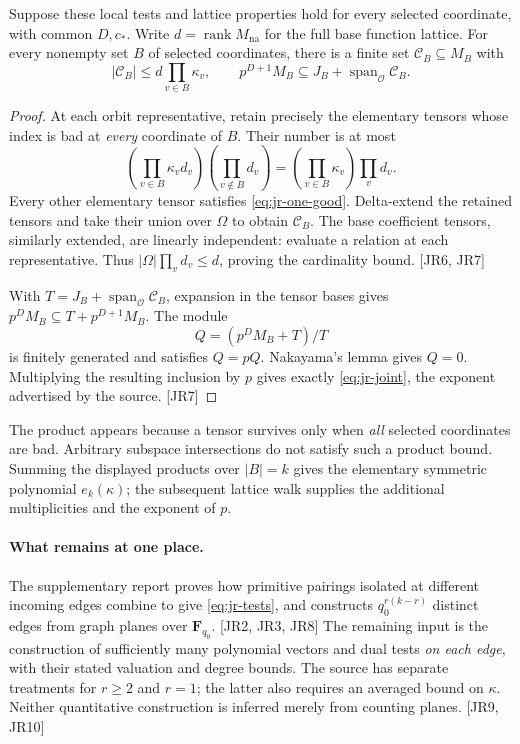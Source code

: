 \begin{proposition}\label{prop:jr-joint}
Suppose these local tests and lattice properties hold for every selected coordinate, with common $D,c_*$. Write $d=\operatorname{rank}M_{\mathrm{na}}$ for the full base function lattice. For every nonempty set $B$ of selected coordinates, there is a finite set $\mathcal C_B\subseteq M_B$ with
\begin{equation}\label{eq:jr-joint}
 |\mathcal C_B|\le d\prod_{v\in B}\kappa_v,
 \qquad
 p^{D+1}M_B\subseteq J_B+\operatorname{span}_{\mathcal O}\mathcal C_B.
\end{equation}
\end{proposition}
\begin{proof}
At each orbit representative, retain precisely the elementary tensors whose index is bad at \emph{every} coordinate of $B$. Their number is at most
\[
 \left(\prod_{v\in B}\kappa_vd_v\right)
 \left(\prod_{v\notin B}d_v\right)
   =\left(\prod_{v\in B}\kappa_v\right)\prod_v d_v.
\]
Every other elementary tensor satisfies \eqref{eq:jr-one-good}. Delta-extend the retained tensors and take their union over $\Omega$ to obtain $\mathcal C_B$. The base coefficient tensors, similarly extended, are linearly independent: evaluate a relation at each representative. Thus $|\Omega|\prod_vd_v\le d$, proving the cardinality bound. \textsf{[JR6, JR7]}

With $T=J_B+\operatorname{span}_{\mathcal O}\mathcal C_B$, expansion in the tensor bases gives $p^DM_B\subseteq T+p^{D+1}M_B$. The module
\[
 Q=(p^DM_B+T)/T
\]
is finitely generated and satisfies $Q=pQ$. Nakayama's lemma gives $Q=0$. Multiplying the resulting inclusion by $p$ gives exactly \eqref{eq:jr-joint}, the exponent advertised by the source. \textsf{[JR7]}
\end{proof}

The product appears because a tensor survives only when \emph{all} selected coordinates are bad. Arbitrary subspace intersections do not satisfy such a product bound. Summing the displayed products over $|B|=k$ gives the elementary symmetric polynomial $e_k(\kappa)$; the subsequent lattice walk supplies the additional multiplicities and the exponent of $p$.

\paragraph{What remains at one place.}
The supplementary report proves how primitive pairings isolated at different incoming edges combine to give \eqref{eq:jr-tests}, and constructs $q_0^{r(k-r)}$ distinct edges from graph planes over $\mathbf F_{q_0}$. \textsf{[JR2, JR3, JR8]} The remaining input is the construction of sufficiently many polynomial vectors and dual tests \emph{on each edge}, with their stated valuation and degree bounds. The source has separate treatments for $r\ge2$ and $r=1$; the latter also requires an averaged bound on $\kappa$. Neither quantitative construction is inferred merely from counting planes. \textsf{[JR9, JR10]}
